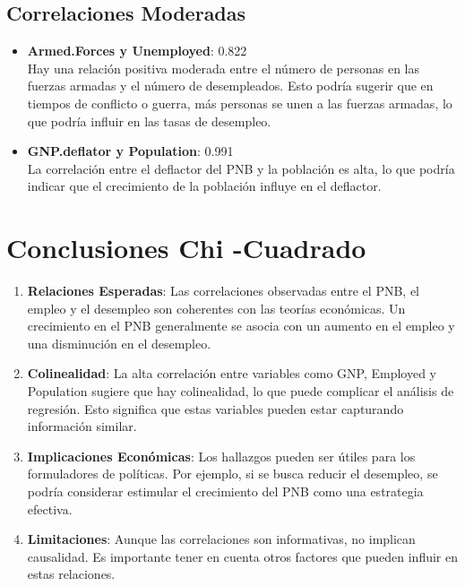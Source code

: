 \documentclass{article}
\begin{document}
\subsection{Correlaciones Moderadas}

\begin{itemize}
    \item \textbf{Armed.Forces y Unemployed}: 0.822\\
    Hay una relación positiva moderada entre el número de personas en las fuerzas armadas y el número de desempleados. Esto podría sugerir que en tiempos de conflicto o guerra, más personas se unen a las fuerzas armadas, lo que podría influir en las tasas de desempleo.
    
    \item \textbf{GNP.deflator y Population}: 0.991\\
    La correlación entre el deflactor del PNB y la población es alta, lo que podría indicar que el crecimiento de la población influye en el deflactor.
\end{itemize}

\section{Conclusiones Chi -Cuadrado}

\begin{enumerate}
    \item \textbf{Relaciones Esperadas}: Las correlaciones observadas entre el PNB, el empleo y el desempleo son coherentes con las teorías económicas. Un crecimiento en el PNB generalmente se asocia con un aumento en el empleo y una disminución en el desempleo.
    
    \item \textbf{Colinealidad}: La alta correlación entre variables como GNP, Employed y Population sugiere que hay colinealidad, lo que puede complicar el análisis de regresión. Esto significa que estas variables pueden estar capturando información similar.
    
    \item \textbf{Implicaciones Económicas}: Los hallazgos pueden ser útiles para los formuladores de políticas. Por ejemplo, si se busca reducir el desempleo, se podría considerar estimular el crecimiento del PNB como una estrategia efectiva.
    
    \item \textbf{Limitaciones}: Aunque las correlaciones son informativas, no implican causalidad. Es importante tener en cuenta otros factores que pueden influir en estas relaciones.
\end{enumerate}
\end{document}
